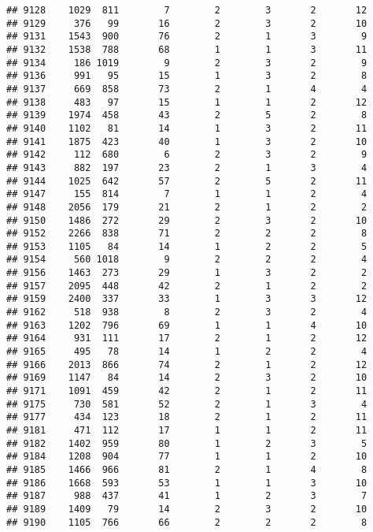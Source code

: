 \documentclass[]{article}
\begin{document}
\begin{verbatim}
## 9128    1029  811        7        2        3       2       12
## 9129     376   99       16        2        3       2       10
## 9131    1543  900       76        2        1       3        9
## 9132    1538  788       68        1        1       3       11
## 9134     186 1019        9        2        3       2        9
## 9136     991   95       15        1        3       2        8
## 9137     669  858       73        2        1       4        4
## 9138     483   97       15        1        1       2       12
## 9139    1974  458       43        2        5       2        8
## 9140    1102   81       14        1        3       2       11
## 9141    1875  423       40        1        3       2       10
## 9142     112  680        6        2        3       2        9
## 9143     882  197       23        2        1       3        4
## 9144    1025  642       57        2        5       2       11
## 9147     155  814        7        1        1       2        4
## 9148    2056  179       21        2        1       2        2
## 9150    1486  272       29        2        3       2       10
## 9152    2266  838       71        2        2       2        8
## 9153    1105   84       14        1        2       2        5
## 9154     560 1018        9        2        2       2        4
## 9156    1463  273       29        1        3       2        2
## 9157    2095  448       42        2        1       2        2
## 9159    2400  337       33        1        3       3       12
## 9162     518  938        8        2        3       2        4
## 9163    1202  796       69        1        1       4       10
## 9164     931  111       17        2        1       2       12
## 9165     495   78       14        1        2       2        4
## 9166    2013  866       74        2        1       2       12
## 9169    1147   84       14        2        3       2       10
## 9171    1091  459       42        2        1       2       11
## 9175     730  581       52        2        1       3        4
## 9177     434  123       18        2        1       2       11
## 9181     471  112       17        1        1       2       11
## 9182    1402  959       80        1        2       3        5
## 9184    1208  904       77        1        1       2       10
## 9185    1466  966       81        2        1       4        8
## 9186    1668  593       53        1        1       3       10
## 9187     988  437       41        1        2       3        7
## 9189    1409   79       14        2        3       2       10
## 9190    1105  766       66        2        2       2        8

\end{verbatim}
\end{document}

